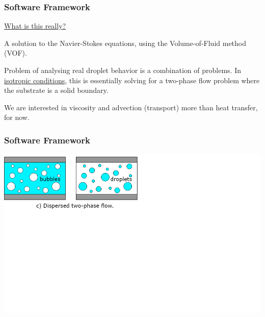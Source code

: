 \documentclass[12pt]{beamer}
\begin{document}
\begin{frame}
    \frametitle{Software Framework}
    \underline{What is this really?}

    A solution to the Navier-Stokes equations,
    using the Volume-of-Fluid method (VOF).

    Problem of analysing real droplet behavior is a combination of problems. In 
    \underline{isotropic conditions}, this is essentially solving for a 
    two-phase flow problem where the substrate is a solid boundary.

    We are interested in viscosity and advection (transport) more than 
    heat transfer, for now.
\end{frame}
\begin{frame}
    \frametitle{Software Framework}

    \includegraphics[width=1.75\textwidth]{img/6-twophase.png}
\end{frame}
\end{document}
